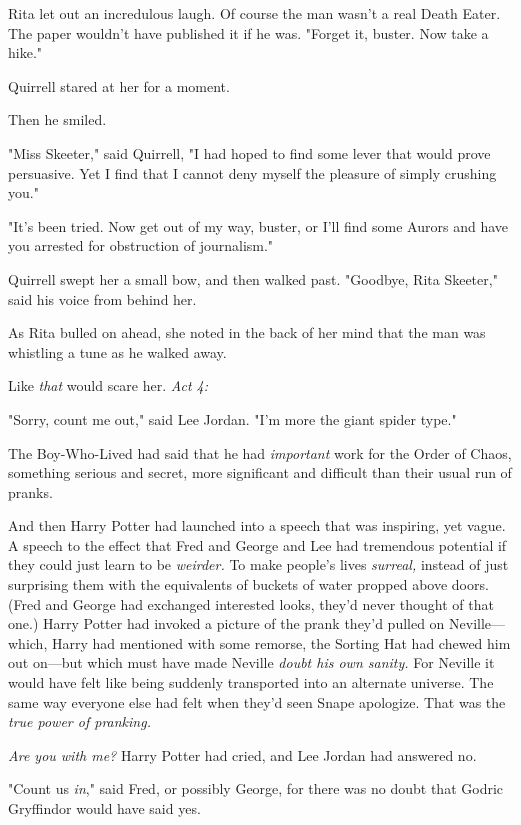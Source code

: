 Rita let out an incredulous laugh. Of course the man wasn't a real Death Eater. 
The paper wouldn't have published it if he was. "Forget it, buster. Now take a 
hike."

Quirrell stared at her for a moment.

Then he smiled.

"Miss Skeeter," said Quirrell, "I had hoped to find some lever that would prove 
persuasive. Yet I find that I cannot deny myself the pleasure of simply 
crushing you."

"It's been tried. Now get out of my way, buster, or I'll find some Aurors and 
have you arrested for obstruction of journalism."

Quirrell swept her a small bow, and then walked past. "Goodbye, Rita Skeeter," 
said his voice from behind her.

As Rita bulled on ahead, she noted in the back of her mind that the man was 
whistling a tune as he walked away.

Like \emph{that} would scare her.
\sbreak
\emph{Act 4:}

"Sorry, count me out," said Lee Jordan. "I'm more the giant spider type."

The Boy-Who-Lived had said that he had \emph{important} work for the Order of 
Chaos, something serious and secret, more significant and difficult than their 
usual run of pranks.

And then Harry Potter had launched into a speech that was inspiring, yet vague. 
A speech to the effect that Fred and George and Lee had tremendous potential if 
they could just learn to be \emph{weirder.} To make people's lives 
\emph{surreal,} instead of just surprising them with the equivalents of buckets 
of water propped above doors. (Fred and George had exchanged interested looks, 
they'd never thought of that one.) Harry Potter had invoked a picture of the 
prank they'd pulled on Neville---which, Harry had mentioned with some remorse, 
the Sorting Hat had chewed him out on---but which must have made Neville 
\emph{doubt his own sanity.} For Neville it would have felt like being suddenly 
transported into an alternate universe. The same way everyone else had felt 
when they'd seen Snape apologize. That was the \emph{true power of pranking.}

\emph{Are you with me?} Harry Potter had cried, and Lee Jordan had answered no.

"Count us \emph{in}," said Fred, or possibly George, for there was no doubt 
that Godric Gryffindor would have said yes.

